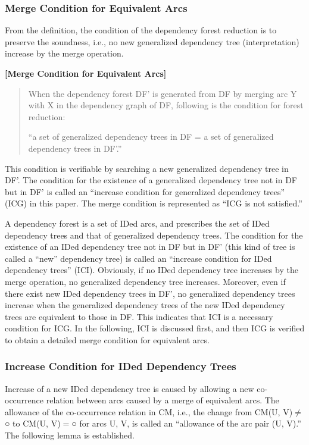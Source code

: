 \documentclass[english]{jnlp_1.4_rep}
\theoremstyle{break}
\theoremstyle{plain}
\theoremstyle{plain}
\begin{document}
\subsubsection{Merge Condition for Equivalent Arcs}

From the definition, the condition of the dependency forest reduction is to preserve the soundness, i.e., no new generalized dependency tree (interpretation) increase by the merge operation.

\noindent
\textbf{[Merge Condition for Equivalent Arcs]}
\begin{quote}
When the dependency forest DF' is generated from DF by
merging arc Y with X in the dependency graph of DF, following is the condition for
forest reduction: 

``a set of generalized dependency trees in DF = a set of generalized
dependency trees in DF'.''
\end{quote}

\noindent
This condition is verifiable by searching a new
generalized dependency tree in DF'. The condition for the existence of
a generalized dependency tree not in DF but in DF' is called an
``increase condition for generalized dependency trees'' (ICG) in this
paper. The merge condition is represented as ``ICG is not
satisfied.''

A dependency forest is a set of IDed arcs, and prescribes the set of
IDed dependency trees and that of generalized dependency trees. The
condition for the existence of an IDed dependency tree not in DF but
in DF' (this kind of tree is called a ``new'' dependency tree) is
called an ``increase condition for IDed dependency trees''
(ICI). Obviously, if no IDed dependency tree increases by the merge
operation, no generalized dependency tree increases. Moreover, even if
there exist new IDed dependency trees in DF', no generalized
dependency trees increase when the generalized dependency trees of the
new IDed dependency trees are equivalent to those in DF. This indicates
that ICI is a necessary condition for ICG. In the following, ICI is
discussed first, and then ICG is verified to obtain a detailed merge
condition for equivalent arcs.


\subsubsection{Increase Condition for IDed Dependency Trees}
\label{subsec:IDDTZoukaJuoken}

Increase of a new IDed dependency tree is caused by allowing a new
co-occurrence relation between arcs caused by a merge of equivalent
arcs. The allowance of the co-occurrence relation in CM, i.e., the
change from CM(U, V)${\neq}$○ to CM(U, V)$=$○ for arcs U, V, is
called an ``allowance of the arc pair (U, V).'' The following lemma is
established.
\end{document}
